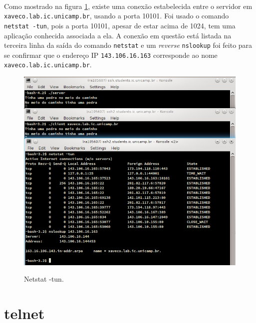 \documentclass[a4paper,10pt,oneside,final,titlepage,onecolumn]{article}
\begin{document}
\paragraph{}Como mostrado na figura \ref{netstat}, existe uma conexão estabelecida entre o servidor em \verb|xaveco.lab.ic.unicamp.br|, usando a porta 10101. Foi usado o comando \verb|netstat -tun|, pois a porta 10101, apesar de estar acima de 1024, tem uma aplicação conhecida associada a ela. A conexão em questão está listada na terceira linha da saída do comando \verb|netstat| e um \emph{reverse} \verb|nslookup| foi feito para se confirmar que o endereço IP \verb|143.106.16.163| corresponde ao nome \verb|xaveco.lab.ic.unicamp.br|.
\begin{figure}[!ht]
  \caption{Netstat -tun.}
  \centering
  \includegraphics[width=117mm]{images/netstat.png}
  \label{netstat}
\end{figure}



\FloatBarrier
\section{telnet}
\end{document}
